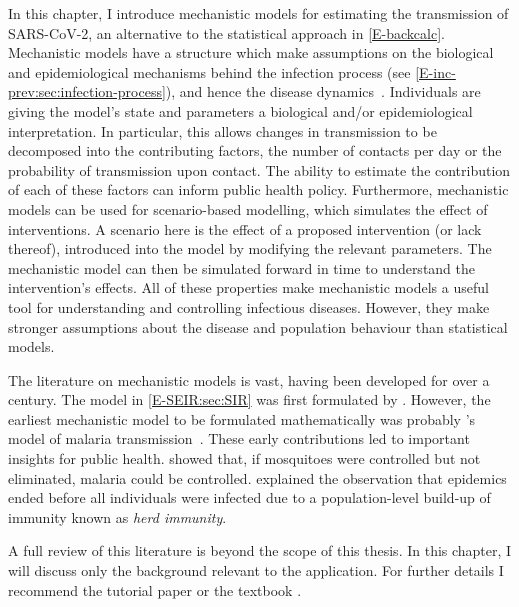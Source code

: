 \documentclass[thesis.tex]{subfiles}
\begin{document}
In this chapter, I introduce mechanistic models for estimating the transmission of SARS-CoV-2, an alternative to the statistical approach in \cref{E-backcalc}.
Mechanistic models have a structure which make assumptions on the biological and epidemiological mechanisms behind the infection process (see \cref{E-inc-prev:sec:infection-process}), and hence the disease dynamics~\autocite{lesslerMechanistic}.
Individuals are giving the model's state and parameters a biological and/or epidemiological interpretation.
In particular, this allows changes in transmission to be decomposed into the contributing factors, \eg the number of contacts per day or the probability of transmission upon contact.
The ability to estimate the contribution of each of these factors can inform public health policy.
Furthermore, mechanistic models can be used for scenario-based modelling, which simulates the effect of interventions.
A scenario here is the effect of a proposed intervention (or lack thereof), introduced into the model by modifying the relevant parameters.
The mechanistic model can then be simulated forward in time to understand the intervention's effects.
All of these properties make mechanistic models a useful tool for understanding and controlling infectious diseases.
However, they make stronger assumptions about the disease and population behaviour than statistical models.

The literature on mechanistic models is vast, having been developed for over a century.
The model in \cref{E-SEIR:sec:SIR} was first formulated by \textcite{kermackContribution}.
However, the earliest mechanistic model to be formulated mathematically was probably \textcite{rossMalariaA}'s model of malaria transmission~\autocite{lesslerMechanistic}.
These early contributions led to important insights for public health.
\Textcite{rossMalariaA} showed that, if mosquitoes were controlled but not eliminated, malaria could be controlled.
\Textcite{kermackContribution} explained the observation that epidemics ended before all individuals were infected due to a population-level build-up of immunity known as \emph{herd immunity}.

A full review of this literature is beyond the scope of this thesis.
In this chapter, I will discuss only the background relevant to the application.
For further details I recommend the tutorial paper \textcite{kretzschmarMathematical} or the textbook \textcite{keelingModeling}.
\end{document}
